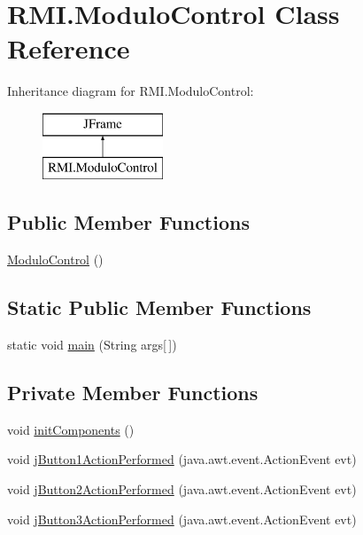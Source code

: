 \hypertarget{class_r_m_i_1_1_modulo_control}{}\section{R\+M\+I.\+Modulo\+Control Class Reference}
\label{class_r_m_i_1_1_modulo_control}
Inheritance diagram for R\+M\+I.\+Modulo\+Control\+:\begin{figure}[H]
\begin{center}
\leavevmode
\includegraphics[height=2.000000cm]{class_r_m_i_1_1_modulo_control}
\end{center}
\end{figure}
\subsection*{Public Member Functions}
\begin{DoxyCompactItemize}
\item 
\mbox{\hyperlink{class_r_m_i_1_1_modulo_control_a59c204b1a6186d387912952c321b34be}{Modulo\+Control}} ()
\end{DoxyCompactItemize}
\subsection*{Static Public Member Functions}
\begin{DoxyCompactItemize}
\item 
static void \mbox{\hyperlink{class_r_m_i_1_1_modulo_control_ab0eae3369259c22e604c80246bae02c1}{main}} (String args\mbox{[}$\,$\mbox{]})
\end{DoxyCompactItemize}
\subsection*{Private Member Functions}
\begin{DoxyCompactItemize}
\item 
void \mbox{\hyperlink{class_r_m_i_1_1_modulo_control_ab6cd2b65e80f40751ef50b6dd3a999b2}{init\+Components}} ()
\item 
void \mbox{\hyperlink{class_r_m_i_1_1_modulo_control_aa1f3423a2628d662e839467d913f0b34}{j\+Button1\+Action\+Performed}} (java.\+awt.\+event.\+Action\+Event evt)
\item 
void \mbox{\hyperlink{class_r_m_i_1_1_modulo_control_a1ee8d16529785370c7fa377b78b54387}{j\+Button2\+Action\+Performed}} (java.\+awt.\+event.\+Action\+Event evt)
\item 
void \mbox{\hyperlink{class_r_m_i_1_1_modulo_control_a1fa4d225beca82a6bdff229861d48ff1}{j\+Button3\+Action\+Performed}} (java.\+awt.\+event.\+Action\+Event evt)
\end{DoxyCompactItemize}

